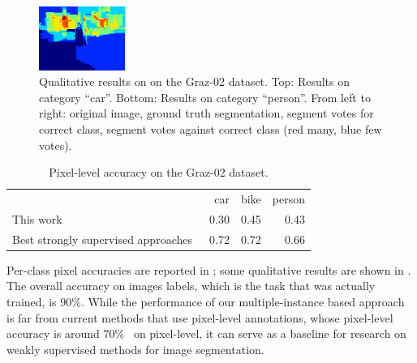 \begin{figure}[tbp]
\begin{center}
        \includegraphics[width=28mm]{images/person1_neg.png}\hspace*{0.7ex}
	\end{center}
        \caption{Qualitative results on on the Graz-02 dataset. Top: Results on
        category ``car''. Bottom: Results on category ``person''. From left to
        right: original image, ground truth segmentation, segment votes for
        correct class, segment votes against correct class (red many, blue few votes).}
\end{figure}

\begin{table}
    \centering
    \caption{Pixel-level accuracy on the Graz-02 dataset.}
    \begin{tabularx}{0.8\textwidth}{lRRR}
    \toprule
                & car & bike & person \\
    \cmidrule(l){2-2}
    \cmidrule(l){3-3}
    \cmidrule(l){4-4}
        This work&   0.30&  0.45&  0.43 \\
        Best strongly supervised approaches~\citep{fulkerson2009class,schulz2011}&   0.72&  0.72&  0.66 \\
    \bottomrule
    \end{tabularx}
\end{table}
Per-class pixel accuracies are reported in ; some qualitative results are shown in . The overall
accuracy on images labels, which is the task that was actually trained, is $90\%$.
While the performance of our multiple-instance based approach is far
from current methods that use pixel-level annotations, whose pixel-level accuracy is around $70\%$~\citep{fulkerson2009class,schulz2011} on pixel-level,
it can serve as a baseline for research on weakly supervised methods for image segmentation.



